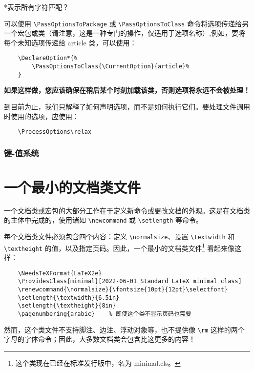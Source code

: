 \begin{explain*}{}
    *表示所有字符匹配？
\end{explain*}

可以使用 \lstinline|\PassOptionsToPackage| 或 \lstinline|\PassOptionsToClass| 命令将选项传递给另一个宏包或类（请注意，这是一种专门的操作，仅适用于选项名称）,例如，要将每个未知选项传递给 article 类，可以使用：
\begin{lstlisting}
    \DeclareOption*{%
        \PassOptionsToClass{\CurrentOption}{article}%
    }
\end{lstlisting}

\textbf{如果这样做，您应该确保在稍后某个时刻加载该类，否则选项将永远不会被处理！}

到目前为止，我们只解释了如何声明选项，而不是如何执行它们。要处理文件调用时使用的选项，应使用：
\begin{lstlisting}
    \ProcessOptions\relax
\end{lstlisting}




\subsubsection{键-值系统}\label{subsubsec:cls-decl-opt-kv}

\section{一个最小的文档类文件}\label{sec:cls-minimal}
一个文档类或宏包的大部分工作在于定义新命令或更改文档的外观。这是在文档类的主体中完成的，使用诸如 \lstinline|\newcommand| 或 \lstinline|\setlength| 等命令。

每个文档类文件必须包含四个内容：定义 \lstinline|\normalsize|、设置 \lstinline|\textwidth| 和 \lstinline|\textheight| 的值，以及指定页码。因此，一个最小的文档类文件\footnote{这个类现在已经在标准发行版中，名为 minimal.cls。} 看起来像这样：
\begin{lstlisting}
    \NeedsTeXFormat{LaTeX2e}
    \ProvidesClass{minimal}[2022-06-01 Standard LaTeX minimal class]
    \renewcommand{\normalsize}{\fontsize{10pt}{12pt}\selectfont}
    \setlength{\textwidth}{6.5in}
    \setlength{\textheight}{8in}
    \pagenumbering{arabic}    % 即使这个类不显示页码也需要
\end{lstlisting}

然而，这个类文件不支持脚注、边注、浮动对象等，也不提供像 \lstinline|\rm| 这样的两个字母的字体命令；因此，大多数文档类会包含比这更多的内容！

